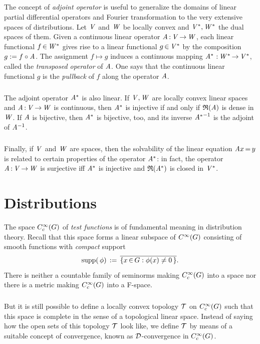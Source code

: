 \documentclass[11pt,twoside]{article}
\begin{document}
\subparagraph{} %
The concept of \textit{adjoint operator} is useful to generalize the domains
of linear partial differential operators and Fourier transformation
to the very extensive spaces of distributions.
Let $\mathit{V}$ and $\mathit{W}$ be locally convex and $\mathit{V}^*, \mathit{W}^*$
the dual spaces of them.
Given a continuous linear operator $\mathit{A} {\,:\,} \mathit{V} {\,\to\,} \mathit{W}$,
each linear functional $f {\,\in\,} \mathit{W}^*$ gives rise to
a linear functional $g {\,\in\,} \mathit{V}^*$ by the composition $g := f \circ \mathit{A}$.
The assignment $f \mapsto g$ induces a continuous mapping
$\mathit{A}^* \, {\,:\,} \mathit{W}^* {\,\to\,} \mathit{V}^*$,
called the \textit{trans\-posed operator} of $\mathit{A}$.
One says that
the continuous linear functional $g$ is the \textit{pullback} of $f$
along the operator $\mathit{A}$.

\subparagraph{}
The adjoint operator $\mathit{A}^*$ is also linear.
If $\mathit{V}, \mathit{W}$ are locally convex linear spaces
and $\mathit{A} {\,:\,} \mathit{V} {\,\to\,} \mathit{W}$ is continuous,
then $\mathit{A}^*$ is injective
if and only if $\mathfrak{R}(\mathit{A}) $ is dense in $\mathit{W}$.
If $\mathit{A}$ is bijective,
then $\mathit{A}^*$ is bijective, too,
and its inverse ${\mathit{A}^*}^{-1}$ is the adjoint of $\mathit{A}^{-1}$.

\subparagraph{}
Finally,
if $\mathit{V}$ and $\mathit{W}$ are {\FRECHET} spaces,
then the solvability of the linear equation $\mathit{A} x {\,=\,} y$ 
is related to certain properties of the operator $\mathit{A}^*$:
in fact,
the operator $\mathit{A} {\,:\,} \mathit{V} {\,\to\,} \mathit{W}$ is surjective
iff
$\mathit{A}^*$ is injective and $\mathfrak{R}(\mathit{A}^*) $ is closed in $\mathit{V}^*$.

\section{Distributions}                                                        %
The space $C_c^{\infty}(G)$ of \textit{test functions} is of fundamental meaning
in distribution theory.
Recall that this space forms a linear subspace of $C^{\infty}(G)$
consisting of smooth functions with \textit{compact} support
\[
\operatorname{supp}(\,\phi) \,:=\, \overline{\{x {\,\in\,} G: \phi(x) \neq 0\,\} }.
\]
There is neither a countable family of seminorms
making $C_c^{\infty}(G)$ into a {\FRECHET} space nor there is a metric making 
$C_c^{\infty}(G)$ into a F-space.

\subparagraph{}
But it is still possible to define a locally convex topology $\mathcal{T}$ on $C_c^{\infty}(G)$
such that this space is complete in the sense of a topological linear space.
Instead of saying how the open sets of this topology $\mathcal{T}$ look like,
we define $\mathcal{T}$ by means of a suitable concept of convergence,
known as ${\mathcal{D}}$-convergence in $C_c^{\infty}(G)$.
\end{document}
